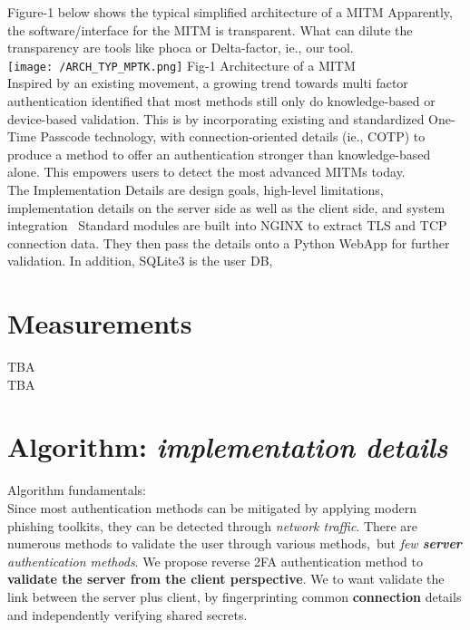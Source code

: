 \documentclass[a4paper, 11pt]{ article}
\begin{document}
\noindent
Figure-1 below shows the typical simplified architecture of a MITM 
Apparently, the software/interface for the MITM is transparent. What can dilute the transparency are tools like phoca or Delta-factor, ie., our tool.\\

\noindent %
\texttt{[image: /ARCH\_TYP\_MPTK.png]}
Fig-1 Architecture of a MITM\\ 

\noindent Inspired by an existing movement, a growing trend towards multi factor authentication
identified that most methods still only do knowledge-based or device-based validation.
This is by incorporating existing and standardized One-Time Passcode technology, with connection-oriented details (ie., COTP)
to produce a method to offer an authentication stronger than knowledge-based alone. This empowers users to detect the most advanced MITMs today.\\

\noindent
The Implementation Details are design goals, high-level limitations, implementation details on the server side as well as the client side, and system integration\
\noindent
Standard modules are built into NGINX to extract TLS and TCP connection data. They then pass the details onto a Python WebApp for further validation. In addition, SQLite3 is the user DB,\\



\section{Measurements}
TBA\\
TBA\\

\section{Algorithm: \textit{implementation details}}
\noindent
Algorithm fundamentals:\\
Since most authentication methods can be mitigated by applying modern phishing toolkits,
they can be detected through \textit{network traffic}.
There are numerous methods to validate the user through various methods, but \textit{few \textbf{server} authentication methods}.
We propose reverse 2FA authentication method to \textbf{validate the server from the client perspective}.
We to want validate the link between the server plus client, by fingerprinting common \textbf{connection} details and independently verifying shared secrets.\\ 
\end{document}
